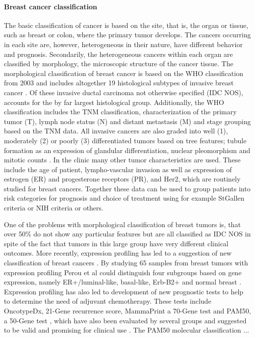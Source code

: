 \paragraph{Breast cancer classification}\label{breast-cancer-classification}

The basic classification of cancer is based on the site, that is, the organ or
tissue, such as breast or colon, where the primary tumor develops. The cancers
occurring in each site are, however, heterogeneous in their nature, have
different behavior and prognosis. Secondarily, the heterogeneous cancers
within each organ are classified by morphology, the microscopic structure of
the cancer tissue.  The morphological classification of breast cancer is based
on the WHO classification from 2003 and includes altogether 19 histological
subtypes of invasive breast cancer \citep{T8,T9}. Of these invasive ductal carcinoma
not otherwise specified (IDC NOS), accounts for the by far largest
histological group.  Additionally, the WHO classification includes the TNM
classification, characterization of the primary tumor (T), lymph node status
(N) and distant metastasis (M) and stage grouping based on the TNM data. All
invasive cancers are also graded into well (1), moderately (2) or poorly (3)
differentiated tumors based on  tree features; tubule formation as an
expression of glandular differentiation, nuclear pleomorphism and mitotic
counts \citep{T8}.  In the clinic many other tumor characteristics are used.  These
include the age of patient, lympho-vascular invasion as well as expression of
estrogen (ER) and progesterone receptors (PR), and Her2, which are routinely
studied for breast cancers. Together these data can be used to group patients
into risk categories for prognosis and choice of treatment using for example
StGallen criteria \citep{T11} or NIH criteria \citep{T12} or others.

One of the problems with morphological classification of breast tumors is,
that over 50\% do not show any particular features but are all classified as
IDC NOS in spite of the fact that tumors in this large group have very
different clinical outcomes. More recently, expression profiling has led to a
suggestion of new classification of breast cancers \citep{T13, T14}. By studying 65
samples from breast tumors with expression profiling Perou et al could
distinguish four subgroups based on gene expression, namely ER+/luminal-like,
basal-like, Erb-B2+ and normal breast \citep{T13}. Expression profiling has also led
to development of new prognostic tests to help to determine the need of
adjuvant chemotherapy.  These tests include OncotypeDx, 21-Gene recurrence
score, MammaPrint a 70-Gene test and PAM50, a 50-Gene test , which have also
been evaluated by several groups and suggested to be valid and promising for
clinical use \citep{T15}. The PAM50 molecular classification ...

